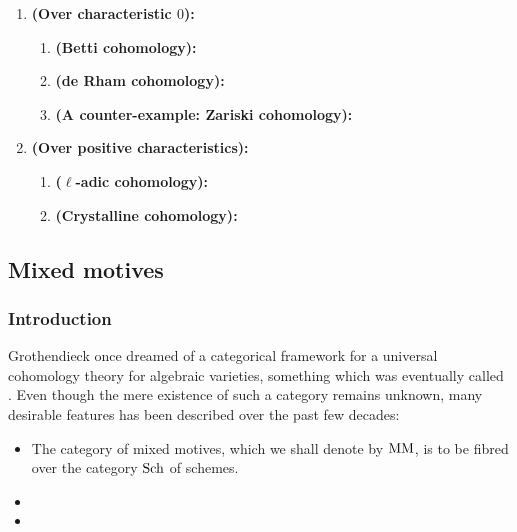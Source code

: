                 \begin{example}
                    \noindent
                    \begin{enumerate}
                        \item \textbf{(Over characteristic $0$):} 
                            \begin{enumerate}
                                \item \textbf{(Betti cohomology):}
                                \item \textbf{(de Rham cohomology):}
                                \item \textbf{(A counter-example: Zariski cohomology):}
                            \end{enumerate}
                        \item \textbf{(Over positive characteristics):}
                            \begin{enumerate}
                                \item \textbf{($\ell$-adic cohomology):}
                                \item \textbf{(Crystalline cohomology):}
                            \end{enumerate}
                    \end{enumerate}
                \end{example}
        
        \subsection{Mixed motives}
            \subsubsection{Introduction}
                Grothendieck once dreamed of a categorical framework for a universal cohomology theory for algebraic varieties, something which was eventually called . Even though the mere existence of such a category remains unknown, many desirable features has been described over the past few decades:
                    \begin{itemize}
                        \item The category of mixed motives, which we shall denote by $\mathrm{MM}$, is to be fibred over the category $\mathrm{Sch}$ of schemes.
                        \item 
                        \item 
                    \end{itemize}
            
